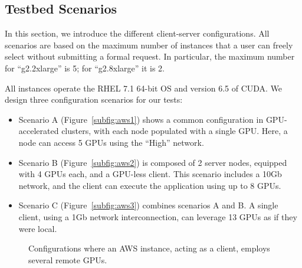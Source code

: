 \documentclass[a4paper,twoside]{article}
\begin{document}
\subsection{Testbed Scenarios}
In this section, we introduce the different client-server configurations. 
All scenarios are based on the maximum number of instances 
that a user can freely select without submitting a formal request. 
In particular, the maximum number for ``g2.2xlarge'' is 5; for ``g2.8xlarge'' it is 2.

All instances operate the RHEL 7.1 64-bit OS and version 6.5 of CUDA. 
We design three configuration scenarios for our tests:

\begin{itemize}
\item Scenario A (Figure~\ref{subfig:aws1}) shows a common 
configuration in GPU-accelerated clusters, with each node  
populated with a single GPU. Here, a node can access 5 GPUs 
using the ``High'' network. 

\item Scenario B (Figure~\ref{subfig:aws2}) is composed of 2 server nodes, equipped 
with 4 GPUs each, and a GPU-less client. This scenario includes 
a 10Gb network, and the client can execute the application using up to 8 GPUs.

\item Scenario C (Figure~\ref{subfig:aws3}) combines scenarios A and B. A 
single client, using a 1Gb network interconnection, can leverage 13 GPUs as if they were local.
\end{itemize}

\begin{figure}[ht]
\centering
{}
\quad
{}
\caption{Configurations where an AWS instance, acting as a client, employs several remote GPUs.}
\label{fig:aws}
\end{figure}
\end{document}
